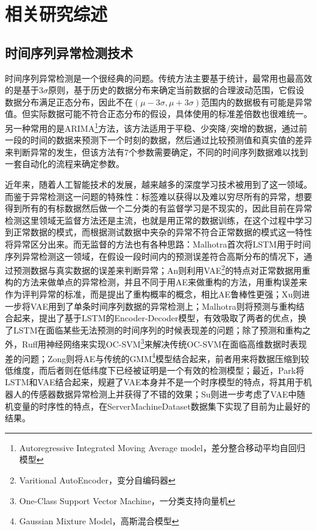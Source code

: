 
\chapter{相关研究综述}
\label{cha:intro}
\section{时间序列异常检测技术}
时间序列异常检测是一个很经典的问题。传统方法主要基于统计，最常用也最高效的是基于3$\sigma$原则，基于历史的数据分布来确定当前数据的合理波动范围，它假设数据分布满足正态分布，因此不在$(\mu - 3\sigma,\mu + 3\sigma)$范围内的数据极有可能是异常值。但实际数据可能不符合正态分布的假设，具体使用的标准差倍数也很难统一。另一种常用的是ARIMA\footnote{Autoregressive Integrated Moving Average model，差分整合移动平均自回归模型}方法，该方法适用于平稳、少突降/突增的数据，通过前一段的时间的数据来预测下一个时刻的数据，然后通过比较预测值和真实值的差异来判断异常的发生，但该方法有7个参数需要确定，不同的时间序列数据难以找到一套自动化的流程来确定参数。

近年来，随着人工智能技术的发展，越来越多的深度学习技术被用到了这一领域。而鉴于异常检测这一问题的特殊性：标签难以获得以及难以穷尽所有的异常，想要得到所有的有标数据然后做一个二分类的有监督学习是不现实的，因此目前在异常检测这里领域无监督方法还是主流，也就是用正常的数据训练，在这个过程中学习到正常数据的模式，而根据测试数据中夹杂的异常不符合正常数据的模式这一特性将异常区分出来。而无监督的方法也有各种思路：Malhotra\cite{malhotra2015long}首次将LSTM用于时间序列异常检测这一领域，在假设一段时间内的预测误差符合高斯分布的情况下，通过预测数据与真实数据的误差来判断异常；An\cite{an2015variational}则利用VAE\footnote{Varitional AutoEncoder，变分自编码器}的特点对正常数据用重构的方法来做单点的异常检测，并且不同于用AE来做重构的方法，用重构误差来作为评判异常的标准，而是提出了重构概率的概念，相比AE鲁棒性更强；Xu\cite{xu2018unsupervised}则进一步将VAE用到了单条时间序列数据的异常检测上；Malhotra\cite{malhotra2016lstm}则将预测与重构结合起来，提出了基于LSTM的Encoder-Decoder模型，有效吸取了两者的优点，换了LSTM在面临某些无法预测的时间序列的时候表现差的问题；除了预测和重构之外，Ruff\cite{ruff2018deep}用神经网络来实现OC-SVM\footnote{One-Class Support Vector Machine，一分类支持向量机}来解决传统OC-SVM在面临高维数据时表现差的问题；Zong\cite{zong2018deep}则将AE与传统的GMM\footnote{Gaussian Mixture Model，高斯混合模型}模型结合起来，前者用来将数据压缩到较低维度，而后者则在低纬度下已经被证明是一个有效的检测模型；最近，Park\cite{park2018multimodal}将LSTM和VAE结合起来，规避了VAE本身并不是一个时序模型的特点，将其用于机器人的传感器数据异常检测上并获得了不错的效果；Su\cite{su2019robust}则进一步考虑了VAE中随机变量的时序性的特点，在ServerMachineDataset数据集下实现了目前为止最好的结果。

